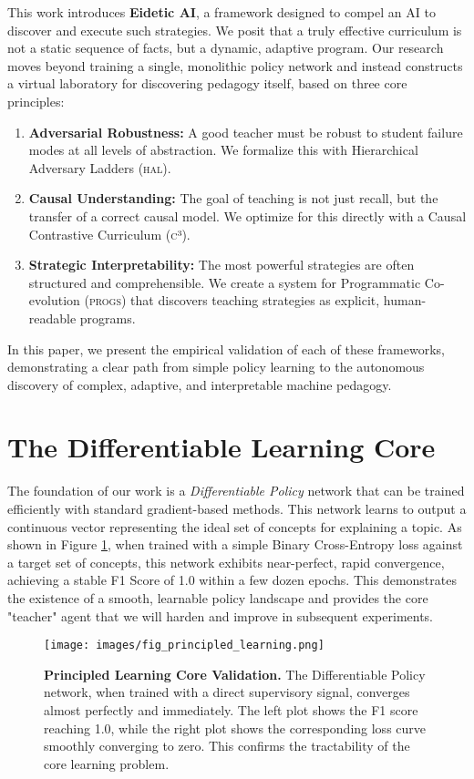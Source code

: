 \documentclass[11pt, letterpaper]{article}
\newcommand{\framework}[1]{\textsc{#1}}
\newcommand{\hal}{\framework{hal}}
\newcommand{\ccc}{\framework{c³}}
\newcommand{\progs}{\framework{progs}}
\newcommand{\eideticai}{\textbf{Eidetic AI}}
\begin{document}
This work introduces \eideticai{}, a framework designed to compel an AI to discover and execute such strategies. We posit that a truly effective curriculum is not a static sequence of facts, but a dynamic, adaptive program. Our research moves beyond training a single, monolithic policy network and instead constructs a virtual laboratory for discovering pedagogy itself, based on three core principles:
\begin{enumerate}
    \item \textbf{Adversarial Robustness:} A good teacher must be robust to student failure modes at all levels of abstraction. We formalize this with Hierarchical Adversary Ladders (\hal{}).
    \item \textbf{Causal Understanding:} The goal of teaching is not just recall, but the transfer of a correct causal model. We optimize for this directly with a Causal Contrastive Curriculum (\ccc{}).
    \item \textbf{Strategic Interpretability:} The most powerful strategies are often structured and comprehensible. We create a system for Programmatic Co-evolution (\progs{}) that discovers teaching strategies as explicit, human-readable programs.
\end{enumerate}
In this paper, we present the empirical validation of each of these frameworks, demonstrating a clear path from simple policy learning to the autonomous discovery of complex, adaptive, and interpretable machine pedagogy.

\section{The Differentiable Learning Core}
The foundation of our work is a \emph{Differentiable Policy} network that can be trained efficiently with standard gradient-based methods. This network learns to output a continuous vector representing the ideal set of concepts for explaining a topic. As shown in Figure \ref{fig:principled_learning}, when trained with a simple Binary Cross-Entropy loss against a target set of concepts, this network exhibits near-perfect, rapid convergence, achieving a stable F1 Score of 1.0 within a few dozen epochs. This demonstrates the existence of a smooth, learnable policy landscape and provides the core "teacher" agent that we will harden and improve in subsequent experiments.

\begin{figure}[h!]
    \centering
    \texttt{[image: images/fig\_principled\_learning.png]}
    \caption{\textbf{Principled Learning Core Validation.} The Differentiable Policy network, when trained with a direct supervisory signal, converges almost perfectly and immediately. The left plot shows the F1 score reaching 1.0, while the right plot shows the corresponding loss curve smoothly converging to zero. This confirms the tractability of the core learning problem.}
    \label{fig:principled_learning}
\end{figure}
\end{document}
